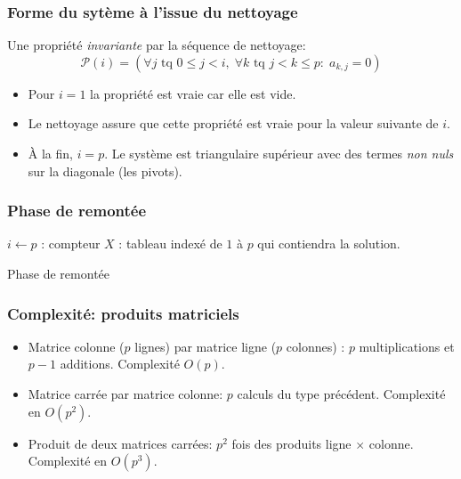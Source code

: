 \begin{frame}
  \frametitle{Forme du sytème à l'issue du nettoyage}
Une propriété \emph{invariante} par la séquence de nettoyage:
\begin{displaymath}
  \mathcal{P}(i) = \left( \forall j \text{ tq } 0\leq j < i,\; \forall k\text{ tq } j<k\leq p: \; a_{k,j} = 0\right) 
\end{displaymath}
\begin{itemize}
  \item Pour $i=1$ la propriété est vraie car elle est vide.\newline
  \item Le nettoyage assure que cette propriété est vraie pour la valeur suivante de $i$.\newline
  \item \`A la fin, $i=p$. Le système est triangulaire supérieur avec des termes \emph{non nuls} sur la diagonale (les pivots).
\end{itemize}  
\end{frame}

\begin{frame}
  \frametitle{Phase de remontée}
\begin{algorithm}[H]
  $i\leftarrow p$ : compteur\;
  $X$ : tableau indexé de $1$ à $p$ qui contiendra la solution.\;
  \caption{Phase de remontée}
  \label{resolsystlin_3}
\end{algorithm}
\end{frame}

\begin{frame}
  \frametitle{Complexité: produits matriciels}
\begin{itemize}
  \item Matrice colonne ($p$ lignes) par matrice ligne ($p$ colonnes) :\newline
  $p$ multiplications et $p-1$ additions. Complexité $O(p)$.
  \item Matrice carrée par matrice colonne: $p$ calculs du type précédent. Complexité en $O(p^2)$.
  \item Produit de deux matrices carrées: $p^2$ fois des produits ligne $\times$ colonne. Complexité en $O(p^3)$.
\end{itemize}
\end{frame}

